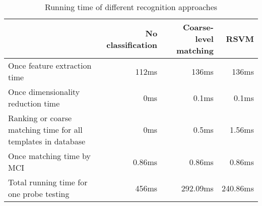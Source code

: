 \begin{table}[htbp]
  \centering
  \caption{Running time of different recognition approaches}
    \begin{tabular}{|p{4.5cm}|r|r|r|}
    \hline
          & No classification & Coarse-level matching & RSVM \\
    \hline
    {Once feature extraction time} & 112ms & 136ms & 136ms \\ \hline
    {Once dimensionality reduction time} & 0ms   & 0.1ms & 0.1ms \\ \hline
    {Ranking or coarse matching time for all templates in database} & 0ms   & 0.5ms & 1.56ms \\ \hline
    {Once matching time by MCI} & 0.86ms & 0.86ms & 0.86ms \\ \hline
    {Total running time for one probe testing} & 456ms & 292.09ms & 240.86ms \\
    \hline
    \end{tabular}%
  \label{tab:experiment:time}%
\end{table}%

